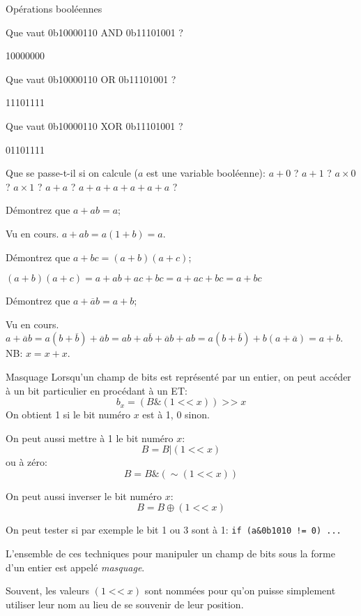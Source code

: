 \begin{exercice}
  \begin{exercicelet}{Opérations booléennes}
    \begin{questions}
    \item Que vaut 0b10000110 AND 0b11101001 ?
      \begin{correction}10000000\end{correction}
    \item Que vaut 0b10000110 OR 0b11101001 ?
      \begin{correction}11101111\end{correction}
    \item Que vaut 0b10000110 XOR 0b11101001 ?
      \begin{correction}01101111\end{correction}
    \item Que se passe-t-il si on calcule ($a$ est une variable booléenne):
      $a+0$ ? $a+1$ ? $a\times 0$ ? $a\times 1$ ? $a+a$ ? $a+a+a+a+a+a$ ?
    \item Démontrez que $a+ab=a$;
      \begin{correction}Vu en cours. $a+ab=a(1+b)=a$.\end{correction}
    \item Démontrez que $a+bc=(a+b)(a+c)$;
      \begin{correction}
        $(a+b)(a+c)=a+ab+ac+bc=a+ac+bc=a+bc$
      \end{correction}
    \item Démontrez que $a+\overline{a}b=a+b$;
      \begin{correction}Vu en
        cours. $a+\overline{a}b=a(b+\overline{b})+\overline{a}b=ab+a\overline{b}+
        \overline{a}b+ab=a(b+\overline{b})+b(a+\overline{a})=a+b$. NB:
        $x=x+x$.\end{correction}
    \end{questions}
  \end{exercicelet}
\end{exercice}
\begin{frame}{Masquage}
  Lorsqu'un champ de bits est représenté par un entier, on peut accéder à un
  bit particulier en procédant à un ET:
  $$b_x=(B\&(1\mathop{<\!<}x))\mathop{>\!>}x$$
  On obtient 1 si le bit numéro $x$ est à 1, 0 sinon.
  
  On peut aussi mettre à 1 le bit numéro $x$:
  $$B=B|(1\mathop{<\!<}x)$$
  ou à zéro:
  $$B=B\&(\sim(1\mathop{<\!<}x))$$

  On peut aussi inverser le bit numéro $x$:
  $$B=B\oplus(1\mathop{<\!<}x)$$

  On peut tester si par exemple le bit 1 ou 3 sont à 1: \texttt{if (a\&0b1010
    != 0) ...}

  L'ensemble de ces techniques pour manipuler un champ de bits sous la forme
  d'un entier est appelé \emph{masquage}.
  
  Souvent, les valeurs $(1\mathop{<\!<}x)$ sont nommées pour qu'on puisse
  simplement utiliser leur nom au lieu de se souvenir de leur position.
\end{frame}
